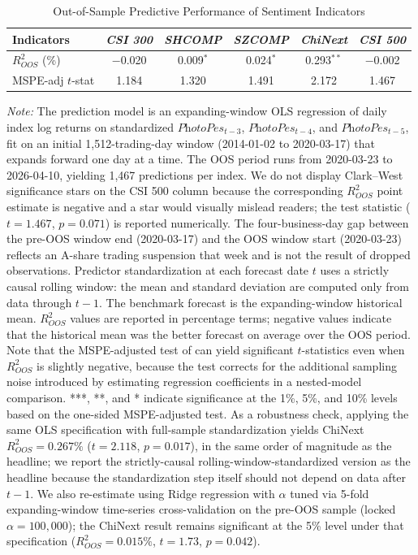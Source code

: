 \documentclass[AER]{AEA}
\begin{document}
\begin{table}[h!]
    \centering
    \caption{Out-of-Sample Predictive Performance of Sentiment Indicators}
    \label{tab:oos_results}
    \setlength{\tabcolsep}{4pt}
    \small
    \begin{tabular}{lccccc}
    \toprule
    Indicators & \textit{CSI 300} & \textit{SHCOMP} & \textit{SZCOMP} & \textit{ChiNext} & \textit{CSI 500} \\
    \midrule
    $R^2_{OOS}$ (\%) & $-$0.020 & 0.009$^{*}$ & 0.024$^{*}$ & 0.293$^{**}$ & $-$0.002 \\
    MSPE-adj $t$-stat & 1.184 & 1.320 & 1.491 & 2.172 & 1.467 \\
    \bottomrule
    \end{tabular}

    \vspace{0.2cm}
    \footnotesize
    \textit{Note:} The prediction model is an expanding-window OLS regression of daily index log returns on standardized $\textit{PhotoPes}_{t-3}$, $\textit{PhotoPes}_{t-4}$, and $\textit{PhotoPes}_{t-5}$, fit on an initial 1{,}512-trading-day window (2014-01-02 to 2020-03-17) that expands forward one day at a time. The OOS period runs from 2020-03-23 to 2026-04-10, yielding 1{,}467 predictions per index. We do not display Clark--West significance stars on the CSI 500 column because the corresponding $R^2_{OOS}$ point estimate is negative and a star would visually mislead readers; the test statistic ($t=1.467$, $p=0.071$) is reported numerically. The four-business-day gap between the pre-OOS window end (2020-03-17) and the OOS window start (2020-03-23) reflects an A-share trading suspension that week and is not the result of dropped observations. Predictor standardization at each forecast date $t$ uses a strictly causal rolling window: the mean and standard deviation are computed only from data through $t-1$. The benchmark forecast is the expanding-window historical mean. $R^2_{OOS}$ values are reported in percentage terms; negative values indicate that the historical mean was the better forecast on average over the OOS period. Note that the MSPE-adjusted test of \citet{clark2007approximately} can yield significant $t$-statistics even when $R^2_{OOS}$ is slightly negative, because the test corrects for the additional sampling noise introduced by estimating regression coefficients in a nested-model comparison. ***, **, and * indicate significance at the 1\%, 5\%, and 10\% levels based on the one-sided MSPE-adjusted test. As a robustness check, applying the same OLS specification with full-sample standardization yields ChiNext $R^2_{OOS}=0.267\%$ ($t=2.118$, $p=0.017$), in the same order of magnitude as the headline; we report the strictly-causal rolling-window-standardized version as the headline because the standardization step itself should not depend on data after $t-1$. We also re-estimate using Ridge regression with $\alpha$ tuned via 5-fold expanding-window time-series cross-validation on the pre-OOS sample (locked $\alpha=100{,}000$); the ChiNext result remains significant at the 5\% level under that specification ($R^2_{OOS}=0.015\%$, $t=1.73$, $p=0.042$).
\end{table}
\end{document}

